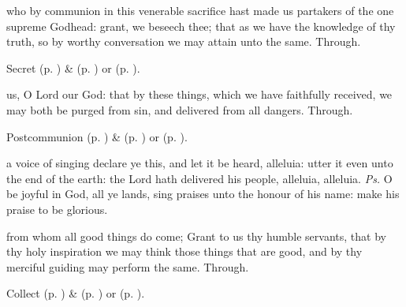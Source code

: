 \secret
{} who by communion in this venerable sacrifice hast made us partakers of the one supreme Godhead: grant, we beseech thee; that as we have the knowledge of thy truth, so by worthy conversation we may attain unto the same. Through.
\begin{rubric}
     Secret  (p. \pageref{SPMaryInEaster}) \&   (p. \pageref{SPAgainst}) or  (p. \pageref{SPChiefBishop}).
\end{rubric}
\postcommunion
{} us, O Lord our God: that by these things, which we have faithfully received, we may both be purged from sin, and delivered from all dangers. Through.
\begin{rubric}
     Postcommunion  (p. \pageref{SPMaryInEaster}) \&   (p. \pageref{SPAgainst}) or  (p. \pageref{SPChiefBishop}).
\end{rubric}


\clearpage
{}


\introit
{} a voice of singing declare ye this, and let it be heard, alleluia: utter it even unto the end of the earth: the Lord hath delivered his people, alleluia, alleluia. \textit{Ps.} O be joyful in God, all ye lands, sing praises unto the honour of his name: make his praise to be glorious.

\collect
{} from whom all good things do come; Grant to us thy humble servants, that by thy holy inspiration we may think those things that are good, and by thy merciful guiding may perform the same. Through.
\begin{rubric}
     Collect  (p. \pageref{SPMaryInEaster}) \&   (p. \pageref{SPAgainst}) or  (p. \pageref{SPChiefBishop}).
\end{rubric}

